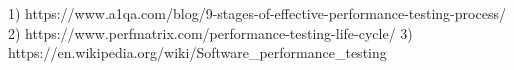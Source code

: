 1) https://www.a1qa.com/blog/9-stages-of-effective-performance-testing-process/
2) https://www.perfmatrix.com/performance-testing-life-cycle/
3) https://en.wikipedia.org/wiki/Software_performance_testing